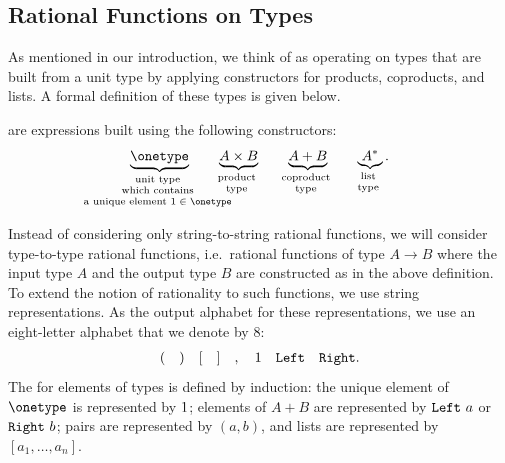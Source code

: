\subsection{Rational Functions on Types}
    As mentioned in our introduction, we think of  as operating on types that are built from a unit type by applying constructors for products, coproducts, and lists. 
A formal definition of these types  is given below.
\begin{definition}
    [Types]\label{def:types}  are expressions built using the following constructors:
\begin{align*}
    \myunderbrace{\onetype}{unit  type \\ which contains \\ a unique element $1 \in \onetype$} 
\qquad
\myunderbrace{A \times B}{product \\ type}
\qquad
\myunderbrace{A + B}{coproduct \\ type}
\qquad
\myunderbrace{A^*}{list \\ type}.
\end{align*}
\end{definition}

Instead of considering only string-to-string rational functions, we will consider type-to-type rational functions, i.e.~rational functions of type $A \to B$ where the input type  $A$ and the output type  $B$ are constructed as in the above definition. To extend the notion of rationality to such functions, we  use string representations. As the output alphabet for these representations,  we use  an eight-letter alphabet that we denote by $8$:
\begin{align*}
( \quad ) \quad [ \quad ] \quad , \quad 1 \quad \mathtt{Left} \quad \mathtt{Right}.
\end{align*}
 The  for elements of types is defined by induction:  the unique element of $\onetype$ is represented by  $1$; elements of $A + B$ are represented by $\mathtt{Left}\  a$ or $\mathtt{Right}\  b$; pairs are represented by $(a,b)$, and lists are represented by $[a_1,\ldots,a_n]$.

